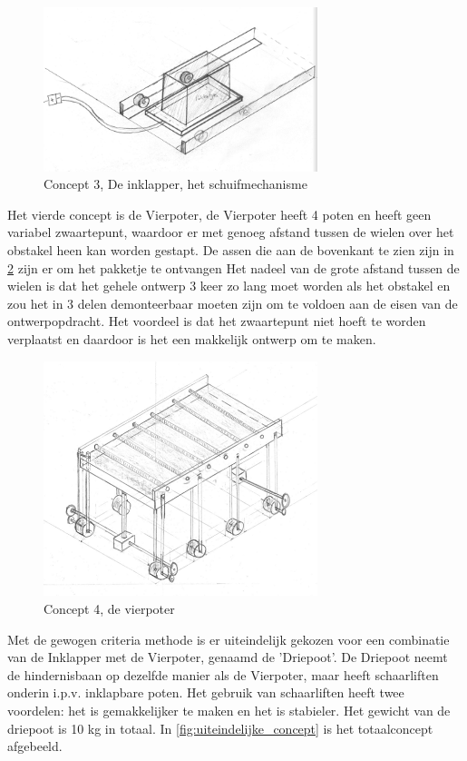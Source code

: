 \begin{figure}[H]
    \centering
    \includegraphics[width = 80mm]{04_idee_ontwikkeling/detail_uitschuiver.png}
    \caption{Concept 3, De inklapper, het schuifmechanisme}
    \label{fig:inklapper_schuif2}
\end{figure}

Het vierde concept is de Vierpoter, de Vierpoter heeft 4 poten en heeft geen variabel zwaartepunt, waardoor er met genoeg afstand tussen de wielen over het obstakel heen kan worden gestapt. De assen die aan de bovenkant te zien zijn in \cref{fig:vierpoter_totaal2} zijn er om het pakketje te ontvangen Het nadeel van de grote afstand tussen de wielen is dat het gehele ontwerp 3 keer zo lang moet worden als het obstakel en zou het in 3 delen demonteerbaar moeten zijn om te voldoen aan de eisen van de ontwerpopdracht. Het voordeel is dat het zwaartepunt niet hoeft te worden verplaatst en daardoor is het een makkelijk ontwerp om te maken.

\begin{figure}[h]
    \centering
    \includegraphics[width = 80mm]{04_idee_ontwikkeling/Foto_vierpoter.PNG}
    \caption{Concept 4, de vierpoter}
    \label{fig:vierpoter_totaal2}
\end{figure}
\vspace{\baselineskip}
Met de gewogen criteria methode is er uiteindelijk gekozen voor een combinatie van de Inklapper met de Vierpoter, genaamd de 'Driepoot'. De Driepoot neemt de hindernisbaan op dezelfde manier als de Vierpoter, maar heeft schaarliften onderin i.p.v. inklapbare poten. Het gebruik van schaarliften heeft twee voordelen: het is gemakkelijker te maken en het is stabieler. Het gewicht van de driepoot is 10 kg in totaal. In \cref{fig:uiteindelijke_concept} is het totaalconcept afgebeeld.

